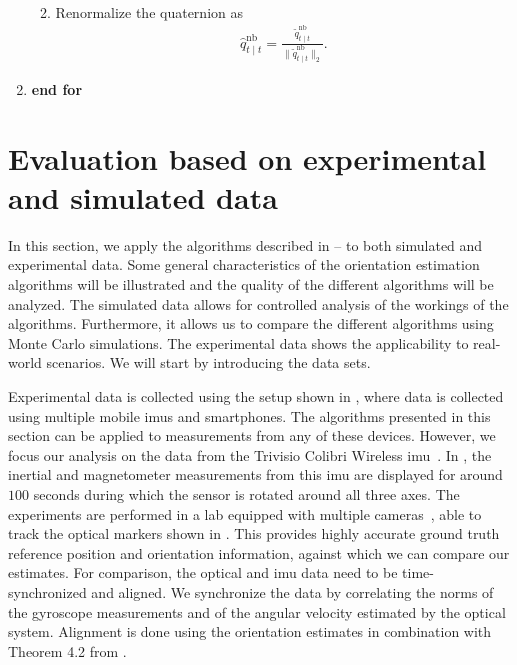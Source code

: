 \begin{algorithm}[ht]
\begin{enumerate}
\begin{enumerate}
\begin{align*}
\end{align*}
\item Renormalize the quaternion as
\begin{align}
\hat{q}_{t \mid t}^\text{nb} = \tfrac{\tilde{q}^\text{nb}_{t \mid t}}{\| \tilde{q}^\text{nb}_{t \mid t}\|_2}.
\end{align}
\end{enumerate}
\item[] \textbf{end for}
\end{enumerate}
\normalsize
\end{algorithm}

\section{Evaluation based on experimental and simulated data}
\label{sec:oriEst-orientationEstimation}
In this section, we apply the algorithms described in -- to both simulated and experimental data. Some general characteristics of the orientation estimation algorithms will be illustrated and the quality of the different algorithms will be analyzed. The simulated data allows for controlled analysis of the workings of the algorithms. Furthermore, it allows us to compare the different algorithms using Monte Carlo simulations. The experimental data shows the applicability to real-world scenarios. We will start by introducing the data sets. 

Experimental data is collected using the setup shown in , where data is collected using multiple mobile \glspl{imu} and smartphones. The algorithms presented in this section can be applied to measurements from any of these devices. However, we focus our analysis on the data from the Trivisio Colibri Wireless \gls{imu}~\citep{trivisio-tutorial}. In , the inertial and magnetometer measurements from this \gls{imu} are displayed for around $100$ seconds during which the sensor is rotated around all three axes. The experiments are performed in a lab equipped with multiple cameras~\citep{vicon-tutorial}, able to track the optical markers shown in . This provides highly accurate ground truth reference position and orientation information, against which we can compare our estimates. For comparison, the optical and \gls{imu} data need to be time-synchronized and aligned. We synchronize the data by correlating the norms of the gyroscope measurements and of the angular velocity estimated by the optical system. Alignment is done using the orientation estimates in combination with Theorem 4.2 from \cite{hol:2011}.

